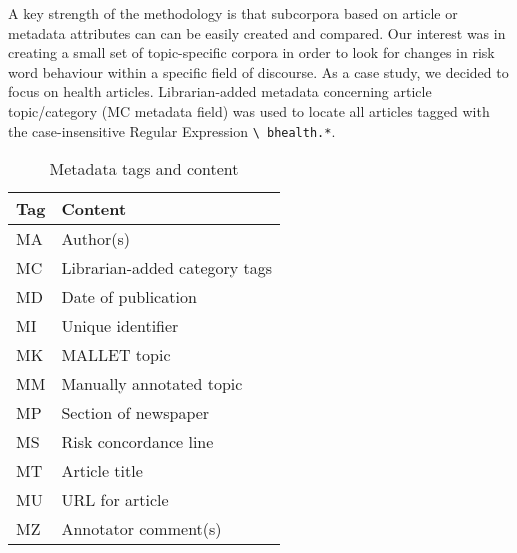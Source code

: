 A key strength of the methodology is that subcorpora based on article or metadata attributes can can be easily created and compared. Our interest was in creating a small set of topic-specific corpora in order to look for changes in risk word behaviour within a specific field of discourse. As a case study, we decided to focus on health articles. Librarian-added metadata concerning article topic/category (MC metadata field) was used to locate all articles tagged with the case-insensitive Regular Expression \texttt{\textbackslash~bhealth.*}. 


    \begin{table}\footnotesize \centering
    \begin{tabular}{ll}
    \toprule
    \textbf{Tag} & \textbf{Content}  \\ \midrule
    MA    & Author(s)       \\ 
    MC    & Librarian-added category tags     \\ 
    MD    & Date of publication        \\ 
    MI    & Unique identifier       \\ 
    MK    & MALLET topic        \\ 
    MM    & Manually annotated topic  \\ 
    MP    & Section of newspaper \\ 
    MS    & Risk concordance line  \\ 
    MT    & Article title        \\ 
    MU    & URL for article         \\ 
    MZ    & Annotator comment(s)       \\ \bottomrule
    \end{tabular}
    \caption{Metadata tags and content}
\end{table}
    
